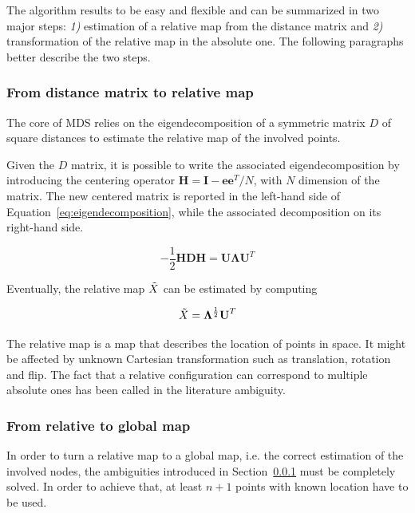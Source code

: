 The algorithm results to be easy and flexible and can be summarized in two major steps: \textit{1)} estimation of a relative map from the distance matrix and \textit{2)} transformation of the relative map in the absolute one. The following paragraphs better describe the two steps.\par

\subsubsection{From distance matrix to relative map}\label{sec:from_d_to_rel_map}
The core of MDS relies on the eigendecomposition of a symmetric matrix $D$ of square distances to estimate the relative map of the involved points. \par

Given the $D$ matrix, it is possible to write the associated eigendecomposition by introducing the centering operator $\textbf{H} = \textbf{I} - \textbf{ee}^T/N$, with $N$ dimension of the matrix. The new centered matrix is reported in the left-hand side of Equation~\ref{eq:eigendecomposition}, while the associated decomposition on its right-hand side.

\begin{equation}
    \label{eq:eigendecomposition}
    -\frac{1}{2}\textbf{H}\textbf{D}\textbf{H} = \textbf{U} \boldsymbol{\Lambda}\textbf{U}^T
\end{equation}

Eventually, the relative map $\Tilde{X}$ can be estimated by computing

\begin{equation}
    \Tilde{X} = \boldsymbol{\Lambda}^\frac{1}{2}\textbf{U}^T
\end{equation}

The relative map is a map that describes the location of points in space. It might be affected by unknown Cartesian transformation such as translation, rotation and flip. The fact that a relative configuration can correspond to multiple absolute ones has been called in the literature ambiguity.

\subsubsection{From relative to global map}
In order to turn a relative map to a global map, i.e. the correct estimation of the involved nodes, the ambiguities introduced in Section~\ref{sec:from_d_to_rel_map} must be completely solved. 
In order to achieve that, at least $n+1$ points with known location have to be used. \par

